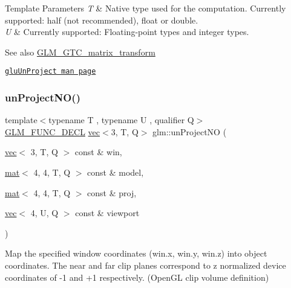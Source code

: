 \begin{DoxyTemplParams}{Template Parameters}
{\em T} & Native type used for the computation. Currently supported\+: half (not recommended), float or double. \\
\hline
{\em U} & Currently supported\+: Floating-\/point types and integer types. \\
\hline
\end{DoxyTemplParams}
\begin{DoxySeeAlso}{See also}
\hyperlink{group__gtc__matrix__transform}{G\+L\+M\+\_\+\+G\+T\+C\+\_\+matrix\+\_\+transform} 

\href{https://www.khronos.org/registry/OpenGL-Refpages/gl2.1/xhtml/gluUnProject.xml}{\tt glu\+Un\+Project man page} 
\end{DoxySeeAlso}
\mbox{\label{group__gtc__matrix__transform_gae089ba9fc150ff69c252a20e508857b5}} 
\subsubsection{\texorpdfstring{un\+Project\+N\+O()}{unProjectNO()}}
{\footnotesize\ttfamily template$<$typename T , typename U , qualifier Q$>$ \\
\hyperlink{setup_8hpp_ab2d052de21a70539923e9bcbf6e83a51}{G\+L\+M\+\_\+\+F\+U\+N\+C\+\_\+\+D\+E\+CL} \hyperlink{structglm_1_1vec}{vec}$<$3, T, Q$>$ glm\+::un\+Project\+NO (\begin{DoxyParamCaption}\item[{\hyperlink{structglm_1_1vec}{vec}$<$ 3, T, Q $>$ const \&}]{win,  }\item[{\hyperlink{structglm_1_1mat}{mat}$<$ 4, 4, T, Q $>$ const \&}]{model,  }\item[{\hyperlink{structglm_1_1mat}{mat}$<$ 4, 4, T, Q $>$ const \&}]{proj,  }\item[{\hyperlink{structglm_1_1vec}{vec}$<$ 4, U, Q $>$ const \&}]{viewport }\end{DoxyParamCaption})}

Map the specified window coordinates (win.\+x, win.\+y, win.\+z) into object coordinates. The near and far clip planes correspond to z normalized device coordinates of -\/1 and +1 respectively. (Open\+GL clip volume definition)


